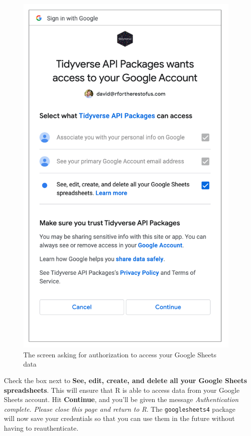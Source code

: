 \documentclass[
]{book}
\begin{document}
\begin{figure}
\includegraphics[width=1\linewidth]{assets/tidyverse-access-r} \caption{The screen asking for authorization to access your Google Sheets data}\label{fig:tidyverse-access-r}
\end{figure}

Check the box next to \textbf{See, edit, create, and delete all your Google Sheets spreadsheets}. This will ensure that R is able to access data from your Google Sheets account. Hit \textbf{Continue}, and you'll be given the message \emph{Authentication complete. Please close this page and return to R}. The \texttt{googlesheets4} package will now save your credentials so that you can use them in the future without having to reauthenticate.
\end{document}
